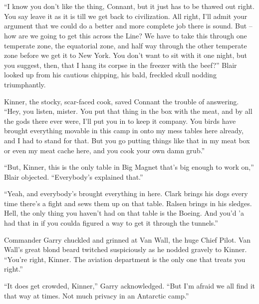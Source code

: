 \documentclass[letterpaper,openany,12pt]{memoir}		%
\begin{document}
\chapter[Chapter 3]{}

\lettrine[lines=3,findent=3pt,nindent=2pt]{``I}{} know you don't like the thing,
Connant, but it just has to be thawed out right. You say leave it as it is till
we get back to civilization. All right, I'll admit your argument that we could
do a better and more complete job there is sound. But -- how are we going to get
this across the Line? We have to take this through one temperate zone, the
equatorial zone, and half way through the other temperate zone before we get it
to New York. You don't want to sit with it one night, but you suggest, then,
that I hang its corpse in the freezer with the beef?'' Blair looked up from his
cautious chipping, his bald, freckled skull nodding triumphantly.

Kinner, the stocky, scar-faced cook, saved Connant the trouble of answering.
``Hey, you listen, mister. You put that thing in the box with the meat, and by
all the gods there ever were, I'll put you in to keep it company. You birds have
brought everything movable in this camp in onto my mess tables here already, and
I had to stand for that. But you go putting things like that in my meat box or
even my meat cache here, and you cook your own damn grub.''

``But, Kinner, this is the only table in Big Magnet that's big enough to work
on,'' Blair objected. ``Everybody's explained that.''

``Yeah, and everybody's brought everything in here. Clark brings his dogs every
time there's a fight and sews them up on that table. Ralsen brings in his
sledges. Hell, the only thing you haven't had on that table is the Boeing. And
you'd 'a had that in if you coulda figured a way to get it through the
tunnels.''

Commander Garry chuckled and grinned at Van Wall, the huge Chief Pilot. Van
Wall's great blond beard twitched suspiciously as he nodded gravely to Kinner.
``You're right, Kinner. The aviation department is the only one that treats you
right.''

``It does get crowded, Kinner,'' Garry acknowledged. ``But I'm afraid we all
find it that way at times. Not much privacy in an Antarctic camp.''
\end{document}
